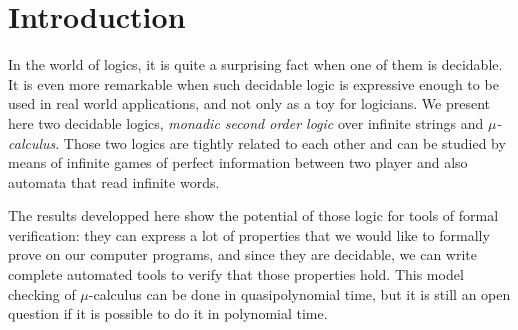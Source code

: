 






\newpage

\section*{Introduction}

In the world of logics, it is
quite a surprising fact when one of them is decidable.
It is even more remarkable when such decidable logic
is expressive enough to be used in real world applications,
and not only as a toy for logicians.
We present here two decidable logics,
\textit{monadic second order logic} over infinite strings
and \textit{$\mu$-calculus}.
Those two logics are tightly related to each other
and can be studied by means of infinite games of perfect information
between two player and also automata that read infinite words.

The results developped here show the potential of those logic
for tools of formal verification: they can express a lot of properties
that we would like to formally prove on our computer programs,
and since they are decidable, we can write complete automated tools
to verify that those properties hold. This model checking
of $\mu$-calculus can be done in quasipolynomial time,
but it is still an open question if it is possible to do it in polynomial time.




